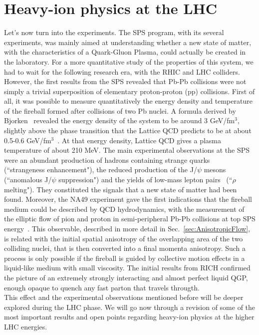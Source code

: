 \section{Heavy-ion physics at the LHC}
Let's now turn into the experiments. The SPS program, with its several experiments, 
was mainly aimed at understanding whether a new state of matter, with the 
characteristics of a Quark-Gluon Plasma, could actually be created in the laboratory.
For a more quantitative study of the properties of this
system, we had to wait for the following research era, with the RHIC and LHC colliders.
However, the first results from the SPS revealed that Pb-Pb collisions 
were not simply a trivial superposition of elementary proton-proton (pp) collisions.
First of all, it was possible to measure quantitatively
the energy density and temperature of the fireball formed after collisions of two Pb nuclei.
A formula derived by Bjorken~\cite{Bjorken} 
revealed the energy density of the system to be around
3 GeV/fm$^{3}$, slightly above the phase transition
that the Lattice QCD predicts to be at about 0.5-0.6 GeV/fm$^3$~\cite{Hands}. At that energy density,
Lattice QCD gives a plasma temperature of about 210 MeV. The main experimental observations at the SPS 
were an abundant production of hadrons
containing strange quarks~\cite{Sandor:2004bg} (``strangeness enhancement"), 
the reduced production of the J/$\psi$ mesons~\cite{Abreu:2000ni} 
(``anomalous J/$\psi$ suppression") and the yields of 
low-mass lepton pairs~\cite{Damjanovic:2005ni} (``$\rho$ melting"). They constituted 
the signals that a new state of matter had been found.
Moreover, the NA49 experiment gave the first indications that the fireball medium 
could be described by QCD hydrodynamics, with the measurement
of the elliptic flow of pion and proton in semi-peripheral Pb-Pb collisions 
at top SPS energy~\cite{Alt:2003ab}. This observable, described in more detail 
in Sec.~\ref{sec:AnisotropicFlow}, is related with the
initial spatial anisotropy of the overlapping area of the two colliding nuclei, that is 
then converted into a final momenta anisotropy. Such a process is only possible 
if the fireball is guided by collective motion effects in a liquid-like medium with  
small viscosity. The initial results from RICH confirmed the picture 
of an extremely strongly interacting and almost perfect liquid QGP, enough opaque 
to quench any fast parton that travels througth.\\
This effect and the experimental observations mentioned before will be deeper 
explored during the LHC phase. We will go now through a revision of some of the most 
important results and open points regarding heavy-ion physics at the higher LHC energies. 

